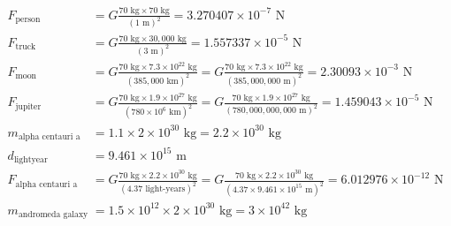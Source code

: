 \documentclass{article}
\theoremstyle{plain}
\begin{document}
\begin{enumerate}
\begin{enumerate}[label=(\alph*)]
                    \begin{align*}
                        F_{\text{person}}           & = G \frac{70 \text{ kg} \times 70 \text{ kg}}{(1 \text{ m})^2} = 3.270407 \times 10^{-7} \text{ N}                                                                                                                                                               \\
                        F_{\text{truck}}            & = G \frac{70 \text{ kg} \times 30,000 \text{ kg}}{(3 \text{ m})^2} = 1.557337 \times 10^{-5} \text{ N}                                                                                                                                                           \\
                        F_{\text{moon}}             & = G \frac{70 \text{ kg} \times 7.3 \times 10^{22} \text{ kg}}{(385,000 \text{ km})^2} = G \frac{70 \text{ kg} \times 7.3 \times 10^{22} \text{ kg}}{(385,000,000 \text{ m})^2} = 2.30093 \times 10^{-3} \text{ N}                                                \\
                        F_{\text{jupiter}}          & = G \frac{70 \text{ kg} \times 1.9 \times 10^{27} \text{ kg}}{(780 \times 10^6 \text{ km})^2} = G \frac{70 \text{ kg} \times 1.9 \times 10^{27} \text{ kg}}{(780,000,000,000 \text{ m})^2} = 1.459043 \times 10^{-5} \text{ N}                                   \\
                        m_{\text{alpha centauri a}} & = 1.1 \times 2 \times 10^{30} \text{ kg}   = 2.2 \times 10^{30} \text{ kg}                                                                                                                                                                                       \\
                        d_{\text{lightyear}}        & = 9.461 \times 10^{15} \text{ m}                                                                                                                                                                                                                                 \\
                        F_{\text{alpha centauri a}} & = G \frac{70 \text{ kg} \times 2.2 \times 10^{30} \text{ kg}}{(4.37 \text{ light-years})^2} = G \frac{70 \text{ kg} \times 2.2 \times 10^{30} \text{ kg}}{(4.37 \times 9.461 \times 10^{15} \text{ m})^2} = 6.012976 \times 10^{-12} \text{ N}                   \\
                        m_{\text{andromeda galaxy}} & = 1.5 \times 10^{12} \times 2 \times 10^{30} \text{ kg} = 3 \times 10^{42} \text{ kg}                                                                                                                                                                            \\

\end{align*}
\end{enumerate}
\end{enumerate}
\end{document}
